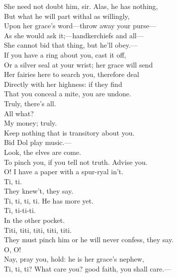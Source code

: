 \documentclass[a4paper,oneside]{memoir}
\begin{document}
\begin{drama*}
\facespeaks She need not doubt him, sir. Alas, he has nothing,\\
But what he will part withal as willingly,\\
Upon her grace's word---throw away your purse---\\
As she would ask it;---handkerchiefs and all---\\
She cannot bid that thing, but he'll obey.---\\
If you have a ring about you, cast it off,\\
Or a silver seal at your wrist; her grace will send\\
Her fairies here to search you, therefore deal\\
Directly with her highness: if they find\\
That you conceal a mite, you are undone.\\
\dapperspeaks Truly, there's all.\\
\facespeaks {} All what?\\
\dapperspeaks {} My money; truly.\\
\facespeaks Keep nothing that is transitory about you.\\
Bid Dol play music.---\\
Look, the elves are come.\\
To pinch you, if you tell not truth. Advise you.\\
\dapperspeaks O! I have a paper with a spur-ryal in't.\\
\facespeaks Ti, ti.\\
They knew't, they say.\\
\subtlespeaks {} Ti, ti, ti, ti. He has more yet.\\
\facespeaks Ti, ti-ti-ti.\\
In the other pocket.\\
\subtlespeaks {} Titi, titi, titi, titi, titi.\\
They must pinch him or he will never confess, they say.\\
\dapperspeaks O, O!\\
\facespeaks {} Nay, pray you, hold: he is her grace's nephew,\\
Ti, ti, ti? What care you? good faith, you shall care.---\\

\end{drama*}
\end{document}
